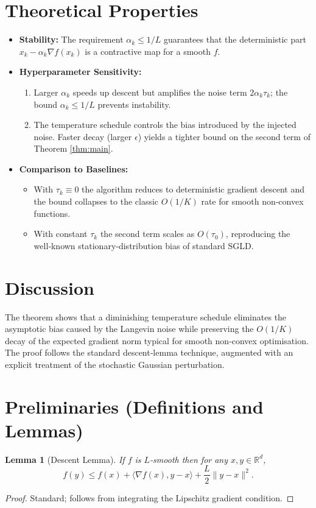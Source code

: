 \documentclass{article}
\newtheorem{lemma}{Lemma}
\newcommand{\R}{\mathbb{R}}
\newcommand{\ip}[2]{\langle #1,#2\rangle}
\begin{document}
\section*{Theoretical Properties}
\begin{itemize}
\item \textbf{Stability:} The requirement $\alpha_k\le 1/L$ guarantees that the deterministic part $x_k-\alpha_k\nabla f(x_k)$ is a contractive map for a smooth $f$.
\item \textbf{Hyperparameter Sensitivity:}
    \begin{enumerate}
        \item Larger $\alpha_k$ speeds up descent but amplifies the noise term $2\alpha_k\tau_k$; the bound $\alpha_k\le 1/L$ prevents instability.
        \item The temperature schedule controls the bias introduced by the injected noise. Faster decay (larger $\epsilon$) yields a tighter bound on the second term of Theorem \ref{thm:main}.
    \end{enumerate}
\item \textbf{Comparison to Baselines:}
    \begin{itemize}
        \item With $\tau_k\equiv0$ the algorithm reduces to deterministic gradient descent and the bound collapses to the classic $O(1/K)$ rate for smooth non‑convex functions.
        \item With constant $\tau_k$ the second term scales as $O(\tau_0)$, reproducing the well‑known stationary‑distribution bias of standard SGLD.
    \end{itemize}
\end{itemize}

\section*{Discussion}
The theorem shows that a diminishing temperature schedule eliminates the asymptotic bias caused by the Langevin noise while preserving the $O(1/K)$ decay of the expected gradient norm typical for smooth non‑convex optimisation. The proof follows the standard descent‑lemma technique, augmented with an explicit treatment of the stochastic Gaussian perturbation.

\newpage
\section*{Preliminaries (Definitions and Lemmas)}
\begin{lemma}[Descent Lemma]\label{lem:descent}
If $f$ is $L$‑smooth then for any $x,y\in\R^d$,
\[
f(y)\le f(x)+\ip{\nabla f(x)}{y-x}+\frac{L}{2}\|y-x\|^2 .
\]
\end{lemma}
\begin{proof}
Standard; follows from integrating the Lipschitz gradient condition. \qedhere
\end{proof}
\end{document}
